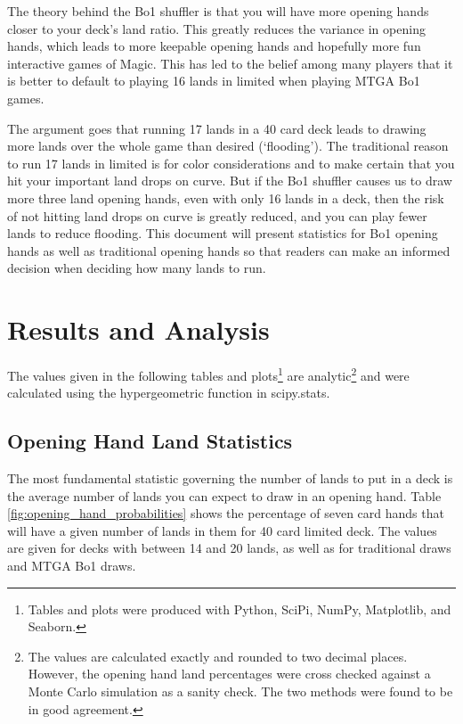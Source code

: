 \documentclass[oneside]{book}   %
\begin{document}
The theory behind the Bo1 shuffler is that you will have more opening hands closer to your deck's land ratio. This greatly reduces the variance in opening hands, which leads to more keepable opening hands and hopefully more fun interactive games of Magic. This has led to the belief among many players that it is better to default to playing 16 lands in limited when playing MTGA Bo1 games. 

The argument goes that running 17 lands in a 40 card deck leads to drawing more lands over the whole game than desired (`flooding'). The traditional reason to run 17 lands in limited is for color considerations and to make certain that you hit your important land drops on curve. But if the Bo1 shuffler causes us to draw more three land opening hands, even with only 16 lands in a deck, then the risk of not hitting land drops on curve is greatly reduced, and you can play fewer lands to reduce flooding. This document will present statistics for Bo1 opening hands as well as traditional opening hands so that readers can make an informed decision when deciding how many lands to run.

\chapter{Results and Analysis}
\label{results}

The values given in the following tables and plots\footnote{Tables and plots were produced with Python, SciPi, NumPy, Matplotlib, and Seaborn.} are analytic\footnote{The values are calculated exactly and rounded to two decimal places. However, the opening hand land percentages were cross checked against a Monte Carlo simulation as a sanity check. The two methods were found to be in good agreement.} and were calculated using the hypergeometric function in scipy.stats.  %

\section{Opening Hand Land Statistics}
\label{opener}

The most fundamental statistic governing the number of lands to put in a deck is the average number of lands you can expect to draw in an opening hand. Table \ref{fig:opening_hand_probabilities} shows the percentage of seven card hands that will have a given number of lands in them for 40 card limited deck. The values are given for decks with between 14 and 20 lands, as well as for traditional draws and MTGA Bo1 draws.  
\end{document}
